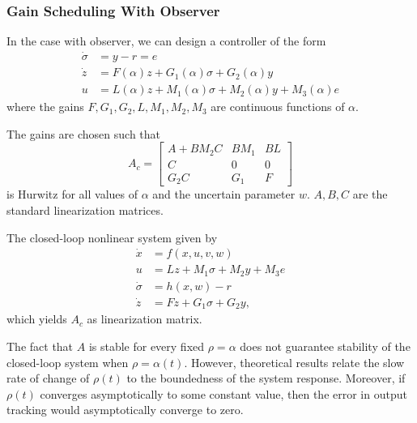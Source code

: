 \subsubsection{Gain Scheduling With Observer}

In the case with observer, we can design a controller of the form
\begin{align*}
    \dot{\sigma} & = y - r = e                                                    \\
    \dot{z}      & = F(\alpha)z + G_1(\alpha)\sigma + G_2(\alpha)y                \\
    u            & = L(\alpha)z + M_1(\alpha)\sigma + M_2(\alpha)y + M_3(\alpha)e
\end{align*}
where the gains $F, G_1, G_2, L, M_1, M_2, M_3$ are continuous functions of $\alpha$.

\newpar{}

The gains are chosen such that
\begin{equation*}
    A_c = \begin{bmatrix} A + BM_2C & BM_1 & BL \\ C & 0 & 0 \\ G_2C & G_1 & F \end{bmatrix}
\end{equation*}
is Hurwitz for all values of $\alpha$ and the uncertain parameter $w$. $A, B, C$ are the standard linearization matrices.

\newpar{}

The closed-loop nonlinear system given by
\begin{align*}
    \dot{x}      & = f(x, u, v, w)                   \\
    u            & = Lz + M_1 \sigma + M_2 y + M_3 e \\
    \dot{\sigma} & = h(x, w) - r                     \\
    \dot{z}      & = Fz + G_1 \sigma + G_2 y,
\end{align*}
which yields $A_c$ as linearization matrix.

\newpar{}

The fact that $A$ is stable for every fixed $\rho = \alpha$ does not guarantee stability of the closed-loop system when $\rho = \alpha(t)$. However, theoretical results relate the slow rate of change of $\rho(t)$ to the boundedness of the system response. Moreover, if $\rho(t)$ converges asymptotically to some constant value, then the error in output tracking would asymptotically converge to zero.

